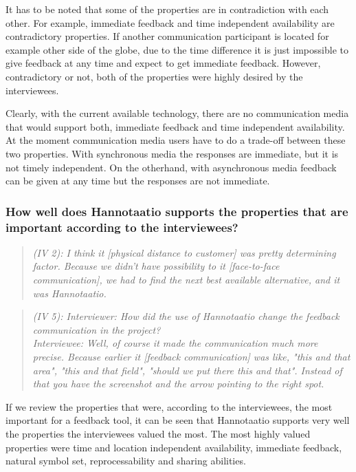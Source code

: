 \documentclass[english,12pt,a4paper,pdftex]{article}
\newcommand{\q}[2]{
\begin{quote}
\emph{(IV #1): #2}
\end{quote}}
\begin{document}
It has to be noted that some of the properties are in contradiction with each other. For example, immediate feedback and time independent availability are contradictory properties. If another communication participant is located for example other side of the globe, due to the time difference it is just impossible to give feedback at any time and expect to get immediate feedback. However, contradictory or not, both of the properties were highly desired by the interviewees.

Clearly, with the current available technology, there are no communication media that would support both, immediate feedback and time independent availability. At the moment communication media users have to do a trade-off between these two properties. With synchronous media the responses are immediate, but it is not timely independent. On the otherhand, with asynchronous media feedback can be given at any time but the responses are not immediate.

\subsubsection{How well does Hannotaatio supports the properties that are important according to the interviewees?}

\q{2}{I think it [physical distance to customer] was pretty determining factor. Because we didn't have possibility to it [face-to-face communication], we had to find the next best available alternative, and it was Hannotaatio.}

\q{5}{Interviewer: How did the use of Hannotaatio change the feedback communication in the project? \\ Interviewee: Well, of course it made the communication much more precise. Because earlier it [feedback communication] was like, "this and that area", "this and that field", "should we put there this and that". Instead of that you have the screenshot and the arrow pointing to the right spot.}

If we review the properties that were, according to the interviewees, the most important for a feedback tool, it can be seen that Hannotaatio supports very well the properties the interviewees valued the most. The most highly valued properties were time and location independent availability, immediate feedback, natural symbol set, reprocessability and sharing abilities. 
\end{document}
